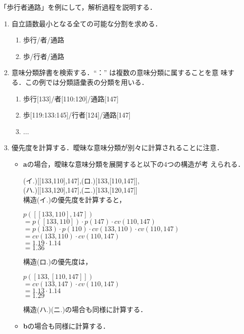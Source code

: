 「歩行者通路」を例にして，解析過程を説明する．
\begin{enumerate}
\item 自立語数最小となる全ての可能な分割を求める．
  \begin{enumerate}
  \item 歩行/者/通路
  \item 歩/行者/通路
  \end{enumerate}
\item 意味分類辞書を検索する．``：'' は複数の意味分類に属することを意
味する．この例では分類語彙表の分類を用いる．
  \begin{enumerate}
  \item[\hspace*{10mm}{\bf a}] 歩行[133]/者[110:120]/通路[147]
  \item[\hspace*{10mm}{\bf b}] 歩[119:133:145]/行者[124]/通路[147]
  \item[\hspace*{10mm}{~}] ...
  \end{enumerate}
\item 優先度を計算する．曖昧な意味分類が別々に計算されることに注意．
  \begin{itemize}
    \item {\bf a}の場合，曖昧な意味分類を展開すると以下の4つの構造が考
えられる．

  (イ.)[[133,110],147],(ロ.)[133,[110,147]],\\
  (ハ.)[[133,120],147],(ニ.)[133,[120,147]]\\
構造(イ.)の優先度を計算すると，

$p([[133,110],147])$\\
    $= p([133,110])\cdot p(147) \cdot cv(110,147)$\\
    $ = p(133)\cdot p(110)\cdot cv(133,110)\cdot cv(110,147)$\\
    $ = cv(133,110)\cdot cv(110,147)$\\
    $ = 1.19 \cdot 1.14$\\
    $ = 1.36$

    構造(ロ.)の優先度は，
    
    $p([133,[110,147]])$\\
    $ = cv(133,147)\cdot cv(110,147)$\\
    $ = 1.13 \cdot 1.14$\\
    $ = 1.29$

構造(ハ.)(ニ.)の場合も同様に計算する．

\item {\bf b}の場合も同様に計算する．
\end{itemize}
\end{enumerate}

